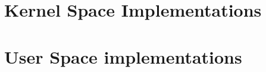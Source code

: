 \documentclass[conference]{IEEEtran}
\begin{document}
	

\section{Kernel Space Implementations}
 
 


\hfill
\section{User Space implementations}
	
	










\end{document}
